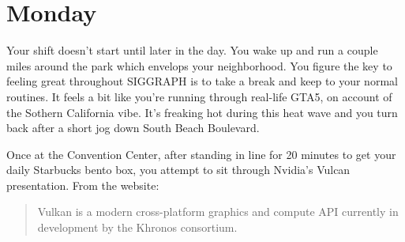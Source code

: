 \documentclass[../main.tex]{subfiles}
\begin{document}
\section{Monday}

Your shift doesn't start until later in the day. You wake up and run a couple miles around the park which envelops your neighborhood. You figure the key to feeling great throughout SIGGRAPH is to take a break and keep to your normal routines. It feels a bit like you're running through real-life GTA5, on account of the Sothern California vibe. It's freaking hot during this heat wave and you turn back after a short jog down South Beach Boulevard.

Once at the Convention Center, after standing in line for 20 minutes to get your daily Starbucks bento box, you attempt to sit through Nvidia's Vulcan presentation. From the website:

\begin{quote}
Vulkan is a modern cross-platform graphics and compute API currently in development by the Khronos consortium.
\end{quote}
\end{document}
